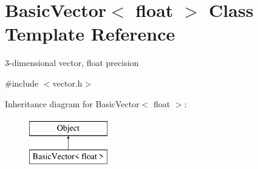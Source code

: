 \hypertarget{classBasicVector_3_01float_01_4}{}\section{Basic\+Vector$<$ float $>$ Class Template Reference}
\label{classBasicVector_3_01float_01_4}


3-\/dimensional vector, float precision  




{\ttfamily \#include $<$vector.\+h$>$}

Inheritance diagram for Basic\+Vector$<$ float $>$\+:\begin{figure}[H]
\begin{center}
\leavevmode
\includegraphics[height=2.000000cm]{classBasicVector_3_01float_01_4}
\end{center}
\end{figure}

